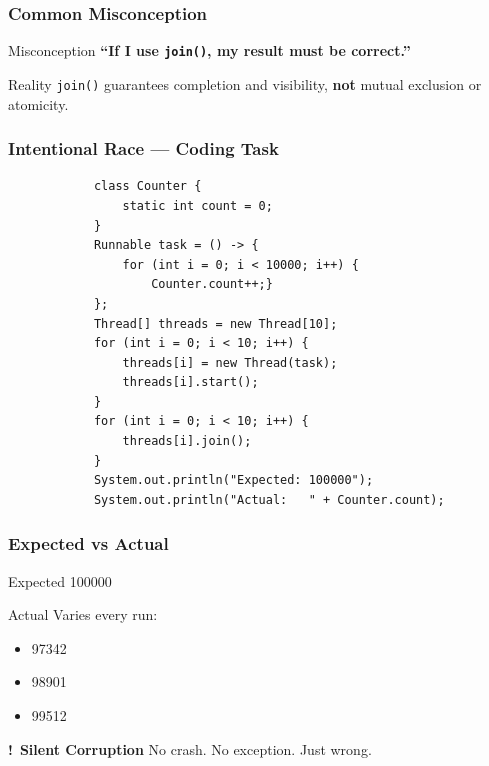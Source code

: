 \documentclass[aspectratio=169,11pt]{beamer}
\newcommand{\warn}{\Large\textbf{\alert{!}}}
\begin{document}
	\begin{frame}
		\frametitle{Common Misconception}
		\begin{block}{Misconception}
			\textbf{“If I use \texttt{join()}, my result must be correct.”}
		\end{block}
		\vspace{3mm}
		\begin{block}{Reality}
			\texttt{join()} guarantees completion and visibility, \textbf{not} mutual exclusion or atomicity.
		\end{block}
	\end{frame}
	
	\begin{frame}[fragile]
		\frametitle{Intentional Race --- Coding Task}
		\begin{lstlisting}
			class Counter {
				static int count = 0;
			}
			Runnable task = () -> {
				for (int i = 0; i < 10000; i++) {
					Counter.count++;}
			};
			Thread[] threads = new Thread[10];
			for (int i = 0; i < 10; i++) {
				threads[i] = new Thread(task);
				threads[i].start();
			}
			for (int i = 0; i < 10; i++) {
				threads[i].join();
			}
			System.out.println("Expected: 100000");
			System.out.println("Actual:   " + Counter.count);\end{lstlisting}
	\end{frame}
	
	\begin{frame}
		\frametitle{Expected vs Actual}
		\begin{block}{Expected}
			100000
		\end{block}
		\begin{block}{Actual}
			Varies every run:
			\begin{itemize}
				\item 97342
				\item 98901
				\item 99512
			\end{itemize}
		\end{block}
		\vspace{3mm}
		\begin{alertblock}{\warn\ \textbf{Silent Corruption}}
			No crash. No exception. Just wrong.
		\end{alertblock}
	\end{frame}
	
\end{document}
